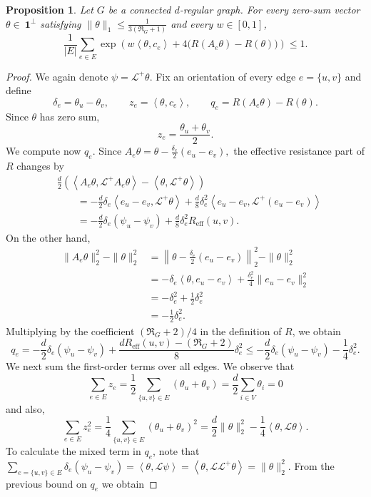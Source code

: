 \documentclass[11pt]{article}
\numberwithin{equation}{section}
\newtheorem{proposition}[theorem]{Proposition}
\newcommand{\1}{\mathbf{1}}
\newcommand{\ip}[2]{\left\langle #1,#2\right\rangle}
\begin{document}
\begin{proposition}
\label{prop:one-step}
Let \(G\) be a connected \(d\)-regular graph. For every zero-sum vector \(\theta\in\ \mathbf 1 ^\perp \) satisfying \(\|\theta\|_1 \le \frac{1}{3(\Re_G+1)}\)
and every \(w\in[0,1]\),
\[
\frac1{|E|}
\sum_{e\in E}
\exp\left(
 w\ip{\theta}{c_e}
+
4\bigl(R(A_e\theta)-R(\theta)\bigr)
\right)
\le1.
\]
\end{proposition}

\begin{proof}
We again denote \(
\psi=\mathcal L^+\theta.\)
Fix an orientation of every edge \(e=\{u,v\}\) and define
\[
\delta_e=\theta_u-\theta_v,
\qquad
z_e=\ip{\theta}{c_e}, \qquad q_e
=
R(A_e\theta)-R(\theta).
\]
Since \(\theta\) has zero sum,
\[
z_e
=
\frac{\theta_u+\theta_v}{2}.
\]
We compute now \(q_e\). Since
\(
A_e\theta
=
\theta-\frac{\delta_e}{2}(e_u-e_v),
\)
the effective resistance part of \(R\) changes by
\[
\begin{aligned}
&\frac d2
\left(
\ip{A_e\theta}{\mathcal L^+A_e\theta}
-
\ip{\theta}{\mathcal L^+\theta}
\right)\\
&\qquad=
-\frac d2\delta_e
\ip{e_u-e_v}{\mathcal L^+\theta}
+
\frac d8\delta_e^2
\ip{e_u-e_v}{\mathcal L^+(e_u-e_v)}\\
&\qquad=
-\frac d2\delta_e(\psi_u-\psi_v)
+
\frac d8\delta_e^2R_{\mathrm{eff}}(u,v).
\end{aligned}
\]
On the other hand,
\[
\begin{aligned}
\|A_e\theta\|_2^2-\|\theta\|_2^2
&=
\left\|
\theta-\frac{\delta_e}{2}(e_u-e_v)
\right\|_2^2
-
\|\theta\|_2^2\\
&=
-\delta_e\ip{\theta}{e_u-e_v}
+
\frac{\delta_e^2}{4}\|e_u-e_v\|_2^2\\
&=
-\delta_e^2+
\frac12\delta_e^2\\
&=
-\frac12\delta_e^2.
\end{aligned}
\]
Multiplying by the coefficient \((\Re_G+2)/4\) in the definition of \(R\), we obtain
\[
q_e
=
-\frac d2\delta_e(\psi_u-\psi_v)
+
\frac{dR_{\mathrm{eff}}(u,v)-(\Re_G+2)}{8}\delta_e^2 
\le
-\frac d2\delta_e(\psi_u-\psi_v)
-
\frac{1}{4}\delta_e^2.
\]
We next sum the first-order terms over all edges. We observe that
\[
\sum_{e\in E}z_e
=
\frac12
\sum_{\{u,v\}\in E}
(\theta_u+\theta_v)
=
\frac d2\sum_{i\in V}\theta_i
=
0
\]
and also,
\[
\sum_{e\in E}z_e^2
=
\frac14
\sum_{\{u,v\}\in E}
(\theta_u+\theta_v)^2
=
\frac d2\|\theta\|_2^2
-
\frac14\ip{\theta}{\mathcal L\theta}.
\]
To calculate the mixed term in \(q_e\), note that
\(
\sum_{e=\{u,v\}\in E} \delta_{e}(\psi_u-\psi_v)=\ip{\theta}{\mathcal L\psi}=\ip{\theta}{\mathcal L \mathcal L^+ \theta}=\|\theta\|_2^2.\) From the previous bound on $q_e$ we obtain

\end{proof}
\end{document}

